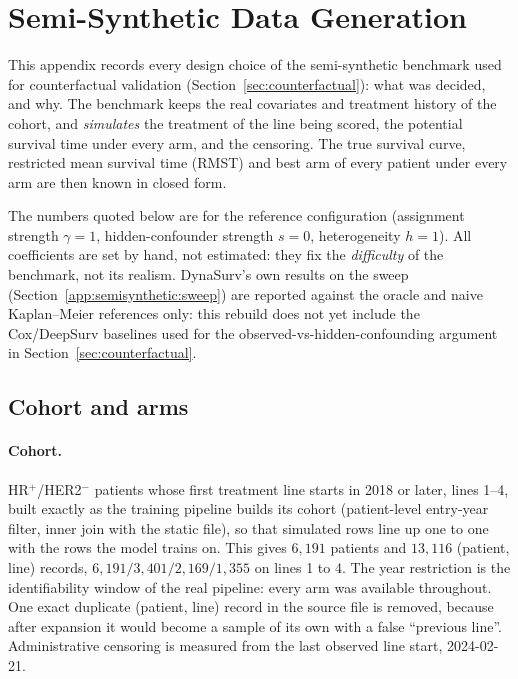 %     

\providecommand{\drv}[1]{\texttt{#1}}
\providecommand{\arm}[1]{\textsc{#1}}
\providecommand{\Ind}{\mathbf{1}}

\section{Semi-Synthetic Data Generation}
\label{app:semisynthetic}

This appendix records every design choice of the semi-synthetic benchmark used for
counterfactual validation (Section~\ref{sec:counterfactual}): what was decided, and why.
The benchmark keeps the real covariates and treatment history of the cohort, and
\emph{simulates} the treatment of the line being scored, the potential survival time under
every arm, and the censoring. The true survival curve, restricted mean survival time (RMST)
and best arm of every patient under every arm are then known in closed form.

The numbers quoted below are for the reference configuration (assignment strength
$\gamma=1$, hidden-confounder strength $s=0$, heterogeneity $h=1$). All coefficients are
set by hand, not estimated: they fix the \emph{difficulty} of the benchmark, not its realism.
DynaSurv's own results on the sweep (Section~\ref{app:semisynthetic:sweep}) are reported
against the oracle and naive Kaplan--Meier references only: this rebuild does not yet include
the Cox/DeepSurv baselines used for the observed-vs-hidden-confounding argument in
Section~\ref{sec:counterfactual}.

\subsection{Cohort and arms}
\label{app:semisynthetic:cohort}

\paragraph{Cohort.} HR$^+$/HER2$^-$ patients whose first treatment line starts in 2018 or
later, lines 1--4, built exactly as the training pipeline builds its cohort (patient-level
entry-year filter, inner join with the static file), so that simulated rows line up one to
one with the rows the model trains on. This gives $6{,}191$ patients and $13{,}116$
(patient, line) records, $6{,}191 / 3{,}401 / 2{,}169 / 1{,}355$ on lines 1 to 4. The year
restriction is the identifiability window of the real pipeline: every arm was available
throughout. One exact duplicate (patient, line) record in the source file is removed, because
after expansion it would become a sample of its own with a false ``previous line''.
Administrative censoring is measured from the last observed line start, 2024-02-21.

